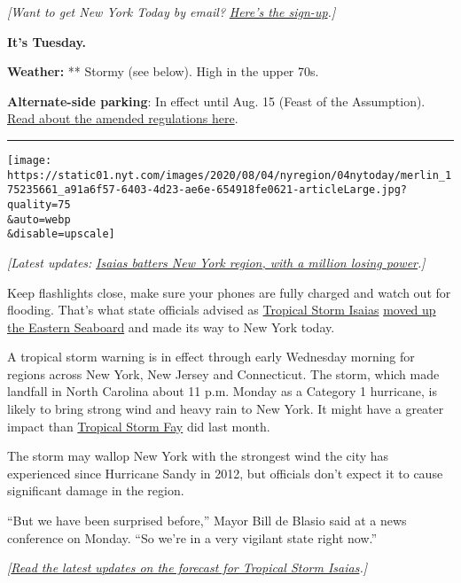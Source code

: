 \emph{{[}Want to get New York Today by email?}
\href{https://www.nytimes.com/newsletters/newyorktoday}{\emph{Here's the
sign-up}}\emph{.{]}}

\textbf{It's Tuesday.}

\textbf{Weather:} ** Stormy (see below). High in the upper 70s.

\textbf{Alternate-side parking}: In effect until Aug. 15 (Feast of the
Assumption).
\href{https://www1.nyc.gov/html/dot/html/motorist/alternate-side-parking.shtml\#reform}{Read
about the amended regulations here}.

\begin{center}\rule{0.5\linewidth}{\linethickness}\end{center}

\texttt{[image: https://static01.nyt.com/images/2020/08/04/nyregion/04nytoday/merlin\_175235661\_a91a6f57-6403-4d23-ae6e-654918fe0621-articleLarge.jpg?quality=75\\\&auto=webp\\\&disable=upscale]}

\emph{{[}Latest updates:}
\href{https://www.nytimes.com/2020/08/04/nyregion/nj-ny-Isaias-hurricane-storm.html}{\emph{Isaias
batters New York region, with a million losing power}}\emph{.{]}}

Keep flashlights close, make sure your phones are fully charged and
watch out for flooding. That's what state officials advised as
\href{https://www.nytimes.com/2020/08/04/us/isaias-storm-updates.html}{Tropical
Storm Isaias}
\href{https://www.nytimes.com/interactive/2020/07/31/us/hurricane-isaias-tracker-map.html}{moved
up the Eastern Seaboard} and made its way to New York today.

A tropical storm warning is in effect through early Wednesday morning
for regions across New York, New Jersey and Connecticut. The storm,
which made landfall in North Carolina about 11 p.m. Monday as a Category
1 hurricane, is likely to bring strong wind and heavy rain to New York.
It might have a greater impact than
\href{https://www.nytimes.com/2020/07/10/nyregion/tropical-storm-fay-nyc.html}{Tropical
Storm Fay} did last month.

The storm may wallop New York with the strongest wind the city has
experienced since Hurricane Sandy in 2012, but officials don't expect it
to cause significant damage in the region.

``But we have been surprised before,'' Mayor Bill de Blasio said at a
news conference on Monday. ``So we're in a very vigilant state right
now.''

\emph{{[}}\href{https://www.nytimes.com/2020/08/03/us/isaias-storm-updates.html}{\emph{Read
the latest updates on the forecast for Tropical Storm
Isaias}}\emph{.{]}}

